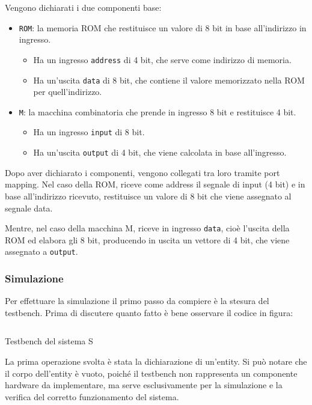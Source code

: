Vengono dichiarati i due componenti base:

\begin{itemize}
    \item \texttt{ROM}: la memoria ROM che restituisce un valore di 8 bit in base all'indirizzo in ingresso.
    \begin{itemize}
        \item Ha un ingresso \texttt{address} di 4 bit, che serve come indirizzo di memoria.
        \item Ha un'uscita \texttt{data} di 8 bit, che contiene il valore memorizzato nella ROM per quell'indirizzo.
    \end{itemize}
    \item \texttt{M}: la macchina combinatoria che prende in ingresso 8 bit e restituisce 4 bit.
    \begin{itemize}
        \item Ha un ingresso \texttt{input} di 8 bit.
        \item Ha un'uscita \texttt{output} di 4 bit, che viene calcolata in base all'ingresso.
    \end{itemize}
\end{itemize}

Dopo aver dichiarato i componenti, vengono collegati tra loro tramite port mapping. Nel caso della ROM, riceve come address il segnale di input (4 bit) e in base all’indirizzo ricevuto, restituisce un valore di 8 bit che viene assegnato al segnale data. 

Mentre, nel caso della macchina M, riceve in ingresso \texttt{data}, cioè l’uscita della ROM ed elabora gli 8 bit, producendo in uscita un vettore di 4 bit, che viene assegnato a \texttt{output}.

\subsubsection{Simulazione}
Per effettuare la simulazione il primo passo da compiere è la stesura del testbench. Prima di discutere quanto fatto è bene osservare il codice in figura:

\begin{code}
    \inputminted{vhdl}{vhdl/2_S_tb.vhd}
    \caption{Testbench del sistema S}
    \label{cod:2_S_tb}
\end{code}

La prima operazione svolta è stata la dichiarazione di un’entity. Si può notare che il corpo dell’entity è vuoto, poiché il testbench non rappresenta un componente hardware da implementare, ma serve esclusivamente per la simulazione e la verifica del corretto funzionamento del sistema.

